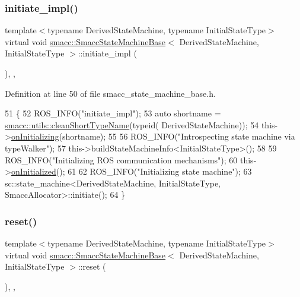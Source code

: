 \subsubsection{\texorpdfstring{initiate\+\_\+impl()}{initiate\_impl()}}
{\footnotesize\ttfamily template$<$typename Derived\+State\+Machine, typename Initial\+State\+Type$>$ \\
virtual void \hyperlink{structsmacc_1_1SmaccStateMachineBase}{smacc\+::\+Smacc\+State\+Machine\+Base}$<$ Derived\+State\+Machine, Initial\+State\+Type $>$\+::initiate\+\_\+impl (\begin{DoxyParamCaption}{ }\end{DoxyParamCaption})\hspace{0.3cm}{\ttfamily [inline]}, {\ttfamily [override]}, {\ttfamily [virtual]}}



Definition at line 50 of file smacc\+\_\+state\+\_\+machine\+\_\+base.\+h.


\begin{DoxyCode}
51     \{
52         ROS\_INFO(\textcolor{stringliteral}{"initiate\_impl"});
53         \textcolor{keyword}{auto} shortname = \hyperlink{namespacesmacc_1_1utils_aacd1975bb7cd9bec4b50e111a2ae7edb}{smacc::utils::cleanShortTypeName}(\textcolor{keyword}{typeid}(
      DerivedStateMachine));
54         this->\hyperlink{classsmacc_1_1ISmaccStateMachine_ae8c9c79ca6cd77c975f5d9cda33a6d5e}{onInitializing}(shortname);
55 
56         ROS\_INFO(\textcolor{stringliteral}{"Introspecting state machine via typeWalker"});
57         this->buildStateMachineInfo<InitialStateType>();
58 
59         ROS\_INFO(\textcolor{stringliteral}{"Initializing ROS communication mechanisms"});
60         this->\hyperlink{classsmacc_1_1ISmaccStateMachine_a95e7f71d0d88fffd0afebb1f9ccdade5}{onInitialized}();
61 
62         ROS\_INFO(\textcolor{stringliteral}{"Initializing state machine"});
63         sc::state\_machine<DerivedStateMachine, InitialStateType, SmaccAllocator>::initiate();
64     \}
\end{DoxyCode}
\mbox{\label{structsmacc_1_1SmaccStateMachineBase_af34aec9fa012f0e3858131c84abfd5ed}} 
\subsubsection{\texorpdfstring{reset()}{reset()}}
{\footnotesize\ttfamily template$<$typename Derived\+State\+Machine, typename Initial\+State\+Type$>$ \\
virtual void \hyperlink{structsmacc_1_1SmaccStateMachineBase}{smacc\+::\+Smacc\+State\+Machine\+Base}$<$ Derived\+State\+Machine, Initial\+State\+Type $>$\+::reset (\begin{DoxyParamCaption}{ }\end{DoxyParamCaption})\hspace{0.3cm}{\ttfamily [inline]}, {\ttfamily [override]}, {\ttfamily [virtual]}}



